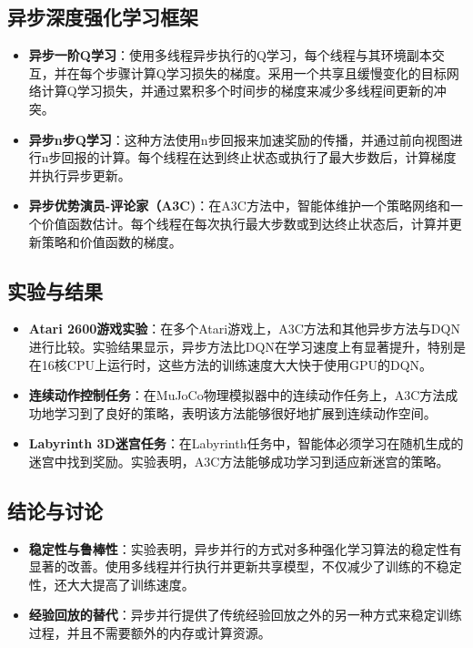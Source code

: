 \documentclass[twocolumn, 10pt]{article} %
\begin{document}
\subsection{ 异步深度强化学习框架}
\begin{itemize}
    \item \textbf{异步一阶Q学习}：使用多线程异步执行的Q学习，每个线程与其环境副本交互，并在每个步骤计算Q学习损失的梯度。采用一个共享且缓慢变化的目标网络计算Q学习损失，并通过累积多个时间步的梯度来减少多线程间更新的冲突。
\end{itemize}
\begin{itemize}
    \item \textbf{异步n步Q学习}：这种方法使用n步回报来加速奖励的传播，并通过前向视图进行n步回报的计算。每个线程在达到终止状态或执行了最大步数后，计算梯度并执行异步更新。
\end{itemize}
\begin{itemize}
    \item \textbf{异步优势演员-评论家（A3C)}：在A3C方法中，智能体维护一个策略网络和一个价值函数估计。每个线程在每次执行最大步数或到达终止状态后，计算并更新策略和价值函数的梯度。
\end{itemize}

\subsection{实验与结果}
\begin{itemize}
    \item \textbf{Atari 2600游戏实验}：在多个Atari游戏上，A3C方法和其他异步方法与DQN进行比较。实验结果显示，异步方法比DQN在学习速度上有显著提升，特别是在16核CPU上运行时，这些方法的训练速度大大快于使用GPU的DQN。
\end{itemize}
\begin{itemize}
    \item \textbf{连续动作控制任务}：在MuJoCo物理模拟器中的连续动作任务上，A3C方法成功地学习到了良好的策略，表明该方法能够很好地扩展到连续动作空间。
\end{itemize}
\begin{itemize}
    \item \textbf{Labyrinth 3D迷宫任务}：在Labyrinth任务中，智能体必须学习在随机生成的迷宫中找到奖励。实验表明，A3C方法能够成功学习到适应新迷宫的策略。
\end{itemize}

\subsection{ 结论与讨论}
\begin{itemize}
    \item \textbf{稳定性与鲁棒性}：实验表明，异步并行的方式对多种强化学习算法的稳定性有显著的改善。使用多线程并行执行并更新共享模型，不仅减少了训练的不稳定性，还大大提高了训练速度。
\end{itemize}
\begin{itemize}
    \item \textbf{经验回放的替代}：异步并行提供了传统经验回放之外的另一种方式来稳定训练过程，并且不需要额外的内存或计算资源。
\end{itemize}
\end{document}
